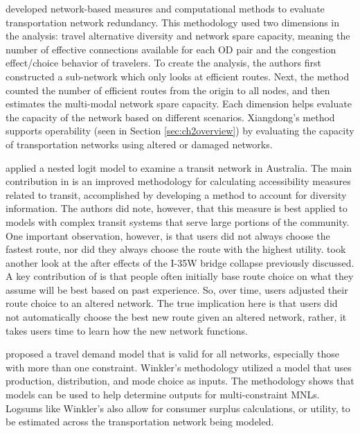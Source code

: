 \citet{xiangdong2015} developed network-based measures and computational
methods to evaluate transportation network redundancy. This methodology used
two dimensions in the analysis: travel alternative diversity and network spare
capacity, meaning the number of effective connections available for each OD
pair and the congestion effect/choice behavior of travelers. To create the
analysis, the authors first constructed a sub-network which only looks at
efficient routes. Next, the method counted the number of efficient routes
from the origin to all nodes, and then estimates the multi-modal network
spare capacity. Each dimension helps evaluate the capacity of the network
based on different scenarios. Xiangdong's method supports operability
(seen in Section \ref{sec:ch2overview}) by evaluating the capacity of
transportation networks using altered or damaged networks.

\citet{Nassir2016} applied a nested logit model to examine a transit
network in Australia. The main contribution in \citet{Nassir2016} is an
improved methodology for calculating accessibility measures related to
transit, accomplished by developing a method to account for diversity
information. The authors did note, however, that this measure is best applied
to models with complex transit systems that serve large portions of the
community. One important observation, however, is that users did not always
choose the fastest route, nor did they always choose the route with the
highest utility. \citet{He2012} took another look at the after effects of
the I-35W bridge collapse previously discussed. A key contribution of
\citet{He2012} is that people often initially base route choice on what they
assume will be best based on past experience. So, over time, users
adjusted their route choice to an altered network. The true implication here
is that users did not automatically choose the best new route given an
altered network, rather, it takes users time to learn how the new network
functions.

\citet{winkler2016} proposed a travel demand model that is valid for all
networks,
especially those with more than one constraint.
Winkler’s methodology
utilized a
model that uses production, distribution, and mode choice as inputs. The
methodology shows that models can be used to help determine outputs for
multi-constraint MNLs. Logsums like Winkler’s
also allow for consumer surplus calculations,
or utility, to be estimated across the transportation network
being modeled.

